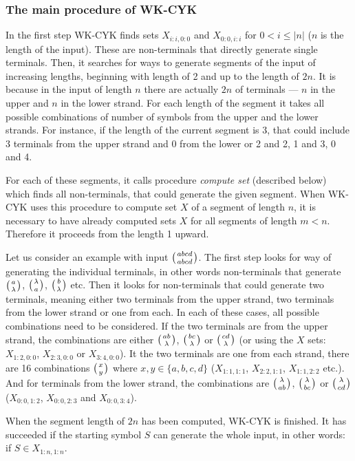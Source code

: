 \subsubsection{The main procedure of WK-CYK}
In the first step WK-CYK finds sets $X_{i:i,0:0}$ and $X_{0:0,i:i}$ for $0 < i \leq |n|$ ($n$ is the length of the input). These are non-terminals that directly generate single terminals. Then, it searches for ways to generate segments of the input of increasing lengths, beginning with length of 2 and up to the length of $2n$. It is because in the input of length $n$ there are actually $2n$ of terminals --- $n$ in the upper and $n$ in the lower strand. For each length of the segment it takes all possible combinations of number of symbols from the upper and the lower strands. For instance, if the length of the current segment is 3, that could include 3 terminals from the upper strand and 0 from the lower or 2 and 2, 1 and 3, 0 and 4.

For each of these segments, it calls procedure \textit{compute set} (described below) which finds all non-terminals, that could generate the given segment. When WK-CYK uses this procedure to compute set $X$ of a segment of length $n$, it is necessary to have already computed sets $X$ for all segments of length $m < n$. Therefore it proceeds from the length 1 upward.

Let us consider an example with input $\wkpair{abcd}{abcd}$. The first step looks for way of generating the individual terminals, in other words non-terminals that generate $\wkpair{a}{\lambda}$, $\wkpair{\lambda}{a}$, $\wkpair{b}{\lambda}$ etc. Then it looks for non-terminals that could generate two terminals, meaning either two terminals from the upper strand, two terminals from the lower strand or one from each. In each of these cases, all possible combinations need to be considered. If the two terminals are from the upper strand, the combinations are either $\wkpair{ab}{\lambda}$, $\wkpair{bc}{\lambda}$ or $\wkpair{cd}{\lambda}$ (or using the $X$ sets: $X_{1:2,0:0}$, $X_{2:3,0:0}$ or $X_{3:4,0:0}$). It the two terminals are one from each strand, there are 16 combinations $\wkpair{x}{y}$ where $x, y \in \{a, b, c, d\}$ ($X_{1:1,1:1}$, $X_{2:2,1:1}$, $X_{1:1,2:2}$ etc.). And for terminals from the lower strand, the combinations are $\wkpair{\lambda}{ab}$, $\wkpair{\lambda}{bc}$ or $\wkpair{\lambda}{cd}$ ($X_{0:0,1:2}$, $X_{0:0,2:3}$ and $X_{0:0,3:4}$).

When the segment length of $2n$ has been computed, WK-CYK is finished. It has succeeded if the starting symbol $S$ can generate the whole input, in other words: if $S \in X_{1:n,1:n}$.


